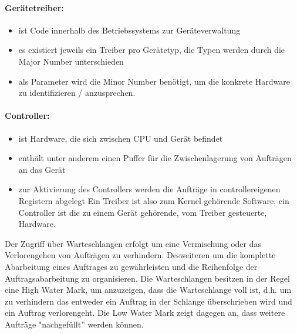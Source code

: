 \begin{answer}
  \paragraph{Gerätetreiber:}
  \begin{itemize}
    \item ist Code innerhalb des Betriebssystems zur Geräteverwaltung
    \item es existiert jeweils ein Treiber pro Gerätetyp, die Typen werden durch die Major Number unterschieden
    \item als Parameter wird die Minor Number benötigt, um die konkrete Hardware zu identifizieren / anzusprechen.
  \end{itemize}
  \paragraph{Controller:}
  \begin{itemize}
    \item ist Hardware, die sich zwischen CPU und Gerät befindet
    \item enthält unter anderem einen Puffer für die Zwischenlagerung von Aufträgen an das Gerät
    \item zur Aktivierung des Controllers werden die Aufträge in controllereigenen Registern abgelegt Ein Treiber ist also zum Kernel gehörende Software, ein Controller ist die zu einem Gerät gehörende, vom Treiber gesteuerte, Hardware.
  \end{itemize}

\end{answer}

\begin{answer}
  Der Zugriff über Warteschlangen erfolgt um eine Vermischung oder das Verlorengehen von Aufträgen zu verhindern. Desweiteren um die komplette Abarbeitung eines Auftrages zu gewährleisten und die Reihenfolge der Auftragsabarbeitung zu organisieren.
  Die Warteschlangen besitzen in der Regel eine High Water Mark, um anzuzeigen, dass die Warteschlange voll ist, d.h. um zu verhindern das entweder ein Auftrag in der Schlange überschrieben wird und ein Auftrag verlorengeht. Die Low Water Mark zeigt dagegen an, dass weitere Aufträge "nachgefüllt'' werden können.
\end{answer}

